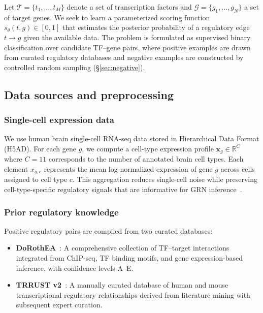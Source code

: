 \documentclass[10pt,twocolumn]{article}
\begin{document}
Let $\mathcal{T} = \{t_1, \ldots, t_M\}$ denote a set of transcription factors and $\mathcal{G} = \{g_1, \ldots, g_N\}$ a set of target genes.
We seek to learn a parameterized scoring function $s_\theta(t, g) \in [0, 1]$ that estimates the posterior probability of a regulatory edge $t \to g$ given the available data.
The problem is formulated as supervised binary classification over candidate TF--gene pairs, where positive examples are drawn from curated regulatory databases and negative examples are constructed by controlled random sampling (\S\ref{sec:negative}).

\subsection{Data sources and preprocessing}
\label{sec:data}

\subsubsection{Single-cell expression data}
\label{sec:expression}

We use human brain single-cell RNA-seq data stored in Hierarchical Data Format (H5AD).
For each gene $g$, we compute a cell-type expression profile $\mathbf{x}_g \in \mathbb{R}^{C}$ where $C = 11$ corresponds to the number of annotated brain cell types.
Each element $x_{g,c}$ represents the mean log-normalized expression of gene $g$ across cells assigned to cell type $c$.
This aggregation reduces single-cell noise while preserving cell-type-specific regulatory signals that are informative for GRN inference~\cite{skinnider2019evaluating}.

\subsubsection{Prior regulatory knowledge}
\label{sec:priors}

Positive regulatory pairs are compiled from two curated databases:
\begin{itemize}
    \item \textbf{DoRothEA}~\cite{garcia2019benchmark}: A comprehensive collection of TF--target interactions integrated from ChIP-seq, TF binding motifs, and gene expression-based inference, with confidence levels A--E.
    \item \textbf{TRRUST v2}~\cite{han2018trrust}: A manually curated database of human and mouse transcriptional regulatory relationships derived from literature mining with subsequent expert curation.
\end{itemize}
\end{document}
